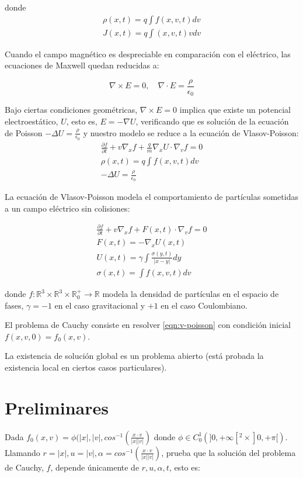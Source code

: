\documentclass[a4paper,10pt]{scrartcl}
\theoremstyle{definition}
\numberwithin{equation}{section}
\begin{document}
donde 
\begin{align*}
\rho(x,t) = q \int f(x,v,t) dv\\
J(x,t) = q \int (x,v,t) v dv
\end{align*}

Cuando el campo magnético es despreciable en comparación con el eléctrico, las ecuaciones de Maxwell quedan reducidas a:

\begin{equation*}
 \nabla \times E = 0, \quad \nabla \cdot E = \frac{\rho}{\epsilon_0}
\end{equation*}

Bajo ciertas condiciones geométricas, $\nabla \times E = 0$ implica que existe un potencial electroestático, $U$, esto es, $E = - \nabla U$, verificando que es solución de la ecuación de Poisson $-\Delta U = \frac{\rho}{\epsilon_0}$ y nuestro modelo se reduce a la ecuación de Vlasov-Poisson:
\begin{align}
 \frac{\partial f}{\partial t} + v \nabla_x f + \frac{q}{m}\nabla_x U \cdot \nabla_v f = 0\\
 \rho(x,t) = q \int f(x,v,t) dv \nonumber\\
 -\Delta U = \frac{\rho}{\epsilon_0} \nonumber
\end{align}


La ecuación de Vlasov-Poisson modela el comportamiento de partículas sometidas a un campo eléctrico sin colisiones:

\begin{align}
\label{eqn:v-poisson}
 \frac{\partial f}{\partial t} + v \nabla_x f + F(x,t) \cdot \nabla_v f = 0\\
 F(x,t) = - \nabla_x U(x,t) \nonumber \\ 
 U(x,t) = \gamma \int \frac{\sigma(y,t)}{|x-y|} dy \nonumber \\
 \sigma(x,t) = \int f(x,v,t) dv \nonumber
\end{align}

donde $f:\mathbb{R}^3 \times \mathbb{R}^3 \times \mathbb{R}^{+}_0 \rightarrow \mathbb{R}$ modela la densidad de partículas en el espacio de fases, $\gamma = -1$ en el caso gravitacional y $+1$ en el caso Coulombiano.

El problema de Cauchy consiste en resolver \eqref{eqn:v-poisson} con condición inicial $f(x,v,0) = f_0(x,v)$.

La existencia de solución global es un problema abierto (está probada la existencia local en ciertos casos particulares).

\section{Preliminares}
Dada $f_0(x,v) = \phi(|x|, |v|, cos^{-1}\left(\frac{x\cdot v}{|x||v|}\right)$ donde $\phi \in C_0^1(]0,+\infty[^2 \times ]0,+\pi[)$. Llamando $r = |x|, u = |v|, \alpha = cos^{-1}\left(\frac{x\cdot v}{|x||v|}\right)$, \cite{Batt} prueba que la solución del problema de Cauchy, $f$, depende únicamente de $r, u, \alpha, t$, esto es:
\end{document}
